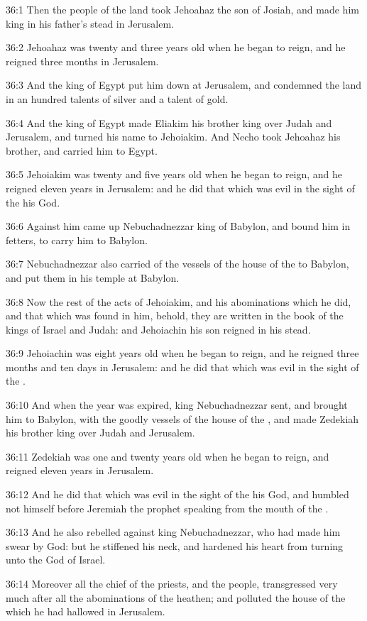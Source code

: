 36:1 Then the people of the land took Jehoahaz the son of Josiah, and
made him king in his father's stead in Jerusalem.

36:2 Jehoahaz was twenty and three years old when he began to reign,
and he reigned three months in Jerusalem.

36:3 And the king of Egypt put him down at Jerusalem, and condemned
the land in an hundred talents of silver and a talent of gold.

36:4 And the king of Egypt made Eliakim his brother king over Judah
and Jerusalem, and turned his name to Jehoiakim. And Necho took
Jehoahaz his brother, and carried him to Egypt.

36:5 Jehoiakim was twenty and five years old when he began to reign,
and he reigned eleven years in Jerusalem: and he did that which was
evil in the sight of the \LORD his God.

36:6 Against him came up Nebuchadnezzar king of Babylon, and bound him
in fetters, to carry him to Babylon.

36:7 Nebuchadnezzar also carried of the vessels of the house of the
\LORD to Babylon, and put them in his temple at Babylon.

36:8 Now the rest of the acts of Jehoiakim, and his abominations which
he did, and that which was found in him, behold, they are written in
the book of the kings of Israel and Judah: and Jehoiachin his son
reigned in his stead.

36:9 Jehoiachin was eight years old when he began to reign, and he
reigned three months and ten days in Jerusalem: and he did that which
was evil in the sight of the \LORD.

36:10 And when the year was expired, king Nebuchadnezzar sent, and
brought him to Babylon, with the goodly vessels of the house of the
\LORD, and made Zedekiah his brother king over Judah and Jerusalem.

36:11 Zedekiah was one and twenty years old when he began to reign,
and reigned eleven years in Jerusalem.

36:12 And he did that which was evil in the sight of the \LORD his God,
and humbled not himself before Jeremiah the prophet speaking from the
mouth of the \LORD.

36:13 And he also rebelled against king Nebuchadnezzar, who had made
him swear by God: but he stiffened his neck, and hardened his heart
from turning unto the \LORD God of Israel.

36:14 Moreover all the chief of the priests, and the people,
transgressed very much after all the abominations of the heathen; and
polluted the house of the \LORD which he had hallowed in Jerusalem.

